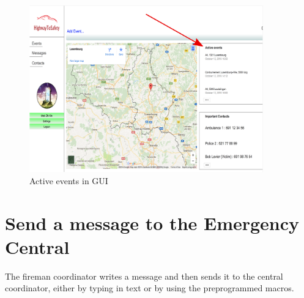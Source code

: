 \begin{minipage}{1.0\textwidth}
\begin{figure}[H]
\caption{Active events in GUI}
\includegraphics[width=0.9\textwidth]{Active_events.eps}
\end{figure}
\end{minipage}



\section{Send a message to the Emergency Central}
\label{operation:MyOperation}
The fireman coordinator writes a message and then sends it to the central
coordinator, either by typing in text or by using the preprogrammed macros.

